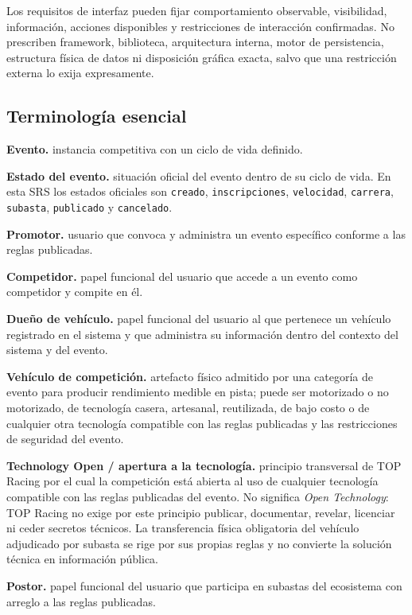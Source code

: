 \documentclass[10pt,letterpaper]{article}
\begin{document}
Los requisitos de interfaz pueden fijar comportamiento observable, visibilidad, información, acciones disponibles y restricciones de interacción confirmadas. No prescriben framework, biblioteca, arquitectura interna, motor de persistencia, estructura física de datos ni disposición gráfica exacta, salvo que una restricción externa lo exija expresamente.

\subsection{Terminología esencial}

\noindent\textbf{Evento.} instancia competitiva con un ciclo de vida definido.\par
\noindent\textbf{Estado del evento.} situación oficial del evento dentro de su ciclo de vida. En esta SRS los estados oficiales son \texttt{creado}, \texttt{inscripciones}, \texttt{velocidad}, \texttt{carrera}, \texttt{subasta}, \texttt{publicado} y \texttt{cancelado}.\par
\noindent\textbf{Promotor.} usuario que convoca y administra un evento específico conforme a las reglas publicadas.\par
\noindent\textbf{Competidor.} papel funcional del usuario que accede a un evento como competidor y compite en él.\par
\noindent\textbf{Dueño de vehículo.} papel funcional del usuario al que pertenece un vehículo registrado en el sistema y que administra su información dentro del contexto del sistema y del evento.\par
\noindent\textbf{Vehículo de competición.} artefacto físico admitido por una categoría de evento para producir rendimiento medible en pista; puede ser motorizado o no motorizado, de tecnología casera, artesanal, reutilizada, de bajo costo o de cualquier otra tecnología compatible con las reglas publicadas y las restricciones de seguridad del evento.\par
\noindent\textbf{Technology Open / apertura a la tecnología.} principio transversal de TOP Racing por el cual la competición está abierta al uso de cualquier tecnología compatible con las reglas publicadas del evento. No significa \emph{Open Technology}: TOP Racing no exige por este principio publicar, documentar, revelar, licenciar ni ceder secretos técnicos. La transferencia física obligatoria del vehículo adjudicado por subasta se rige por sus propias reglas y no convierte la solución técnica en información pública.\par
\noindent\textbf{Postor.} papel funcional del usuario que participa en subastas del ecosistema con arreglo a las reglas publicadas.\par
\end{document}
